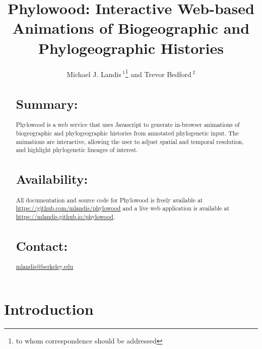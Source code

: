 \documentclass{bioinfo}
\begin{document}

\title[Phylowood: biogeographic animations]{Phylowood: Interactive Web-based Animations of Biogeographic and Phylogeographic Histories}
\author[Sample \textit{et~al}]{Michael J. Landis\,$^{1}$\footnote{to whom correspondence should be addressed}  and Trevor Bedford\,$^2$}
\address{$^{1}$Department of Integrative Biology, UC Berkeley, Berkeley, California, USA\\
$^{2}$Institute of Evolution, University of Edinburgh, Edinburgh, UK}



\maketitle

\begin{abstract}

\section{Summary:} Phylowood is a web service that uses Javascript to generate in-browser animations of biogeographic and phylogeographic histories from annotated phylogenetic input. The animations are interactive, allowing the user to adjust spatial and temporal resolution, and highlight phylogenetic lineages of interest.

\section{Availability:} All documentation and source code for Phylowood is freely available at \href{https://github.com/mlandis/phylowood}{https://github.com/mlandis/phylowood} and a live web application is available at \href{https://mlandis.github.io/phylowood}{https://mlandis.github.io/phylowood}.

\section{Contact:} \href{mlandis@berkeley.edu}{mlandis@berkeley.edu}
\end{abstract}

\section{Introduction}
\end{document}
